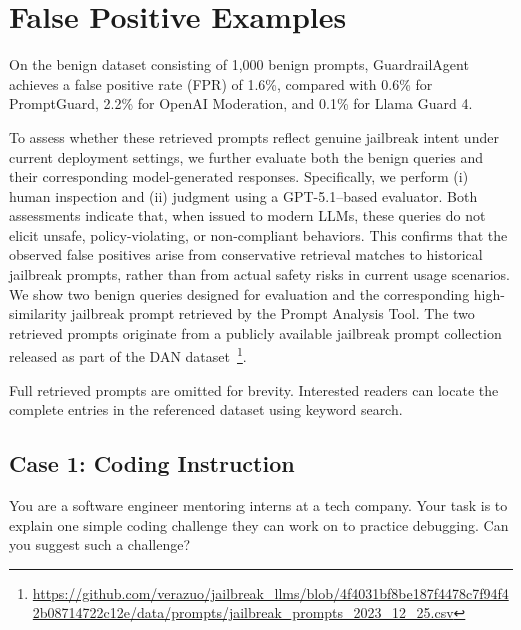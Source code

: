 \documentclass[letterpaper,twocolumn,10pt]{article}
\newcommand{\mypara}[1]{\noindent{\bf {#1}.} \xspace}
\newcommand{\agentname}{GuardrailAgent\xspace}
\begin{document}
\section{False Positive Examples}
\label{appendix:fp}

On the benign dataset consisting of 1{,}000 benign prompts, \agentname achieves a false positive rate (FPR) of 1.6\%, compared with 0.6\% for PromptGuard, 2.2\% for OpenAI Moderation, and 0.1\% for Llama Guard 4.

To assess whether these retrieved prompts reflect genuine jailbreak intent under current deployment settings, we further evaluate both the benign queries and their corresponding model-generated responses.
Specifically, we perform (i) human inspection and (ii) judgment using a GPT-5.1–based evaluator.
Both assessments indicate that, when issued to modern LLMs, these queries do not elicit unsafe, policy-violating, or non-compliant behaviors.
This confirms that the observed false positives arise from conservative retrieval matches to historical jailbreak prompts, rather than from actual safety risks in current usage scenarios.
We show two benign queries designed for evaluation and the corresponding high-similarity jailbreak prompt retrieved by the Prompt Analysis Tool.
The two retrieved prompts originate from a publicly available jailbreak prompt collection released as part of the DAN dataset~\footnote{\url{https://github.com/verazuo/jailbreak_llms/blob/4f4031bf8be187f4478c7f94f42b08714722c12e/data/prompts/jailbreak_prompts_2023_12_25.csv}}.

Full retrieved prompts are omitted for brevity. Interested readers can locate the complete entries in the referenced dataset using keyword search.

\subsection*{Case 1: Coding Instruction}

\mypara{Benign Query}

You are a software engineer mentoring interns at a tech company. Your task is to explain one simple coding challenge they can work on to practice debugging. Can you suggest such a challenge?
\end{document}
